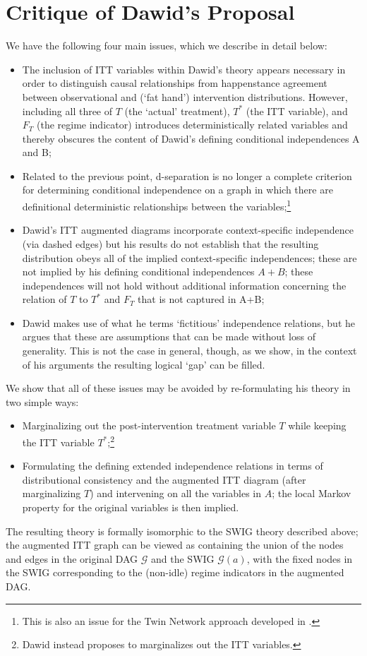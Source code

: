 \documentclass[11pt]{article}
\newcommand{\G}{{\mathscr G}}
\begin{document}
{\eject

\section{Critique of Dawid's Proposal}

We have the following four main issues, which we describe in detail below:
\begin{itemize}
\item[(1)] The inclusion of ITT variables within Dawid's theory appears necessary in order to distinguish causal relationships from happenstance agreement between observational and (`fat hand') intervention distributions. However, including all three of  $T$ (the `actual' treatment), $T^*$ (the ITT variable),  and  $F_T$ (the regime indicator) introduces deterministically related variables and thereby obscures the content of Dawid's defining conditional independences A and B;
\item[(2)] Related to the previous point, d-separation is no longer a complete criterion for determining conditional independence on a graph in which there are definitional deterministic relationships between the variables;\footnote{This is also an issue for the Twin Network approach developed in \citet{pearl:2009}.}
\item[(3)] Dawid's ITT augmented diagrams incorporate context-specific independence (via dashed edges) but his results do not establish that the resulting distribution obeys all of the implied context-specific independences; these are not implied by his defining conditional independences $A+B$; 
these independences will not hold without additional information concerning the relation of  $T$ to $T^*$ and $F_T$ that is not captured in A+B;
\item[(4)] Dawid makes use of what he terms `fictitious' independence relations, but he argues that these are assumptions that can be made without loss of generality. This is not the case in general, though, as we show, in the context of his arguments the resulting logical `gap' can be filled.
\end{itemize}

We show that all of these issues may be avoided by re-formulating his theory in two simple ways:
\begin{itemize}
\item[(I)] Marginalizing out the post-intervention treatment variable $T$ while keeping the ITT variable $T^*$;\footnote{Dawid instead proposes
to marginalizes out the ITT variables.}
\item[(II)] Formulating the defining extended independence relations in terms of distributional consistency and the augmented ITT diagram (after marginalizing $T$) and intervening on all the variables in $A$; the local Markov property for the original variables is then implied.
\end{itemize}
The resulting theory is formally isomorphic to the SWIG theory described above; the augmented ITT graph can be viewed as containing the union
of the nodes and edges in the original DAG $\G$ and the SWIG $\G({a})$, with the fixed nodes in the SWIG corresponding to the (non-idle) regime indicators in the augmented DAG.


}
\end{document}
